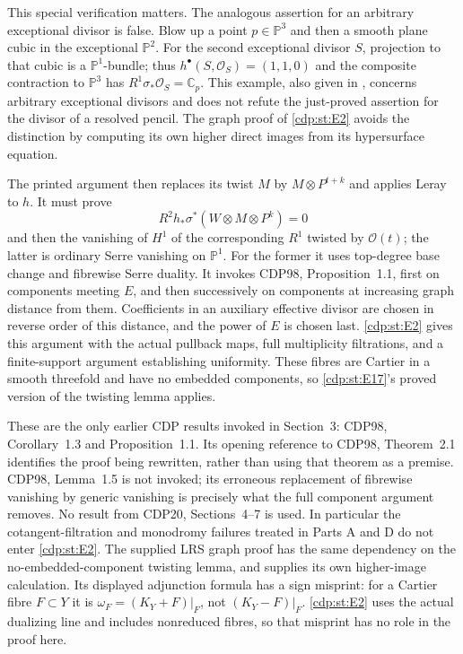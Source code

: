 This special verification matters. The analogous assertion for
an arbitrary exceptional divisor is false. Blow up a point
$p\in\mathbb P^3$ and then a smooth plane cubic in the exceptional
$\mathbb P^2$. For the second exceptional divisor $S$, projection
to that cubic is a $\mathbb P^1$-bundle; thus
$h^\bullet(S,\mathcal O_S)=(1,1,0)$ and the composite contraction
to $\mathbb P^3$ has
$R^1\sigma_*\mathcal O_S=\mathbb C_p$.
This example, also given in \cite{LRS2019}, concerns arbitrary
exceptional divisors and does not refute the just-proved assertion
for the divisor of a resolved pencil. The graph proof of \ref{cdp:st:E2}
avoids the distinction by computing its own higher direct images
from its hypersurface equation.

The printed argument then replaces its twist $M$ by
$M\otimes P^{t+k}$ and applies Leray to $h$. It must prove
\[
 R^2h_*\sigma^*(W\otimes M\otimes P^k)=0
\]
and then the vanishing of $H^1$ of the corresponding $R^1$
twisted by $\mathcal O(t)$; the latter is ordinary Serre
vanishing on $\mathbb P^1$. For the former it uses top-degree
base change and fibrewise Serre duality. It invokes CDP98,
Proposition~1.1, first on components meeting $E$, and then
successively on components at increasing graph distance from
them. Coefficients in an auxiliary effective divisor are chosen
in reverse order of this distance, and the power of $E$ is
chosen last. \ref{cdp:st:E2} gives this argument with the actual pullback
maps, full multiplicity filtrations, and a finite-support
argument establishing uniformity. These fibres are Cartier in
a smooth threefold and have no embedded components, so \ref{cdp:st:E17}'s
proved version of the twisting lemma applies.

These are the only earlier CDP results invoked in Section~3:
CDP98, Corollary~1.3 and Proposition~1.1. Its opening reference
to CDP98, Theorem~2.1 identifies the proof being rewritten,
rather than using that theorem as a premise. CDP98, Lemma~1.5
is not invoked; its erroneous replacement of fibrewise vanishing
by generic vanishing is precisely what the full component
argument removes. No result from CDP20, Sections~4--7 is used.
In particular the cotangent-filtration and monodromy failures
treated in Parts A and D do not enter \ref{cdp:st:E2}. The supplied LRS
graph proof has the same dependency on the no-embedded-component
twisting lemma, and supplies its own higher-image calculation.
Its displayed adjunction formula has a sign misprint:
for a Cartier fibre $F\subset Y$ it is
$\omega_F=(K_Y+F)|_F$, not $(K_Y-F)|_F$.
\ref{cdp:st:E2} uses the actual dualizing line and includes nonreduced fibres,
so that misprint has no role in the proof here.


